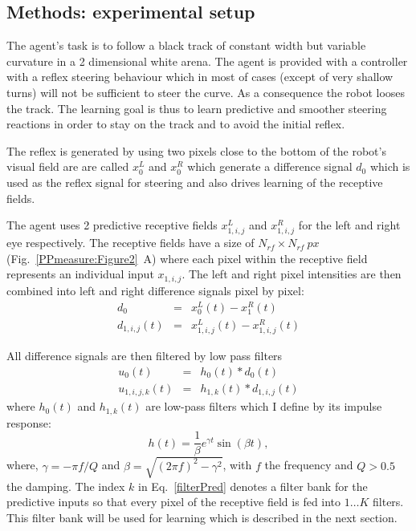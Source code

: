 \subsection{Methods: experimental setup}
\label{Chapter8:RobotStructure}
The agent's task is to follow a black track of constant width but
variable curvature in a 2 dimensional white arena.  The agent is
provided with a controller with a reflex steering behaviour which in
most of cases (except of very shallow turns) will not be sufficient to
steer the curve.  As a consequence the robot looses the track.
The learning goal is thus to learn predictive and smoother steering
reactions in order to stay on the track and to avoid the initial
reflex.

The reflex is generated by using two pixels close to the bottom of
the robot's visual field are are called $x_0^L$ and $x_0^R$ which
generate a difference signal $d_0$ which is used as the reflex
signal for steering and also drives learning of the receptive
fields.

The agent uses 2 predictive receptive fields $x_{1,i,j}^{L}$ and
$x_{1,i,j}^{R}$ for the left and right eye respectively. The receptive
fields have a size of $N_{rf} \times N_{rf}~px$ (Fig.~\ref{PPmeasure:Figure2}~A)
where each pixel within the receptive field represents an individual
input $x_{1,i,j}$. The left and right pixel intensities are then
combined into left and right difference signals pixel by pixel:
\begin{eqnarray}
d_0 & = & x_0^L(t) - x_1^R(t) \label{diffX0} \\
d_{1,i,j}(t) & = & x_{1,i,j}^{L}(t) - x_{1,i,j}^{R}(t) \label{diffX1}
\end{eqnarray}

All difference signals are then filtered by low pass filters
\begin{eqnarray}
u_0(t) & = & h_0(t) * d_0(t) \label{filterReflex} \\
u_{1,i,j,k}(t) & = & h_{1,k}(t) * d_{1,i,j}(t) \label{filterPred}
\end{eqnarray}
where $h_0(t)$ and $h_{1,k}(t)$ are 
low-pass filters which I define by its impulse
response:
\begin{equation}
	h(t)=\frac{1}{\beta}e^{\gamma t}\sin(\beta t),
\end{equation}
where, $\gamma=-\pi f/Q$ and $\beta={\sqrt{(2 \pi f)^2 - \gamma^2}}$,
with $f$ the frequency and $Q>0.5$ the damping. The index
$k$ in Eq.~\ref{filterPred} denotes a filter bank for the predictive
inputs so that every pixel of the receptive field is fed into $1\ldots K$
filters. This filter bank will be used for learning which is described
in the next section.

